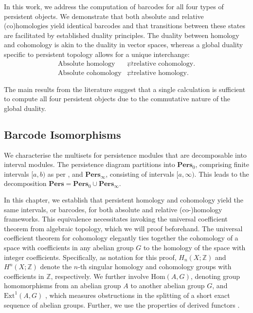 In this work, we address the computation of barcodes for all four types of persistent
objects. We demonstrate that both absolute and relative (co)homologies yield identical
barcodes and that transitions between these states are facilitated by established
duality principles. The duality between homology and cohomology is akin to the
duality in vector spaces, whereas a global duality specific to persistent topology
allows for a unique interchange:
\begin{align*}
	\text{Absolute homology}   & \rightleftarrows \text{relative cohomology.} \\
	\text{Absolute cohomology} & \rightleftarrows \text{relative homology.}
\end{align*}

The main results from the literature suggest that a single calculation is sufficient
to compute all four persistent objects due to the commutative nature of the global
duality.

\subsection{Barcode Isomorphisms}
We characterise the multisets for persistence modules that are decomposable into
interval modules. The persistence diagram partitions into $\textbf{Pers}_{0}$,
comprising finite intervals $[a, b)$ as per \cite[\S 2.3]{de2011dualities}, and $\textbf
{Pers}_{\infty}$, consisting of intervals $[a, \infty)$. This leads to the decomposition
$\textbf{Pers}= \textbf{Pers}_{0} \cup \textbf{Pers}_{\infty}$.

In this chapter, we establish that persistent homology and cohomology yield the
same intervals, or barcodes, for both absolute and relative (co-)homology
frameworks. This equivalence necessitates invoking the universal coefficient theorem
from algebraic topology, which we will proof beforehand. The universal coefficient
theorem for cohomology elegantly ties together the cohomology of a space with coefficients
in any abelian group $G$ to the homology of the space with integer coefficients.
Specifically, as notation for this proof, $H_{n}(X;\mathbb{Z})$ and
$H^{n}(X;\mathbb{Z})$ denote the $n$-th singular homology and cohomology groups
with coefficients in $\mathbb{Z}$, respectively. We further involve
$\text{Hom}(A, G)$, denoting group homomorphisms from an abelian group $A$ to another
abelian group $G$, and $\text{Ext}^{1}(A, G)$ \cite{}, which measures obstructions
in the splitting of a short exact sequence of abelian groups. Further, we use the
properties of derived functors \cite{}.

